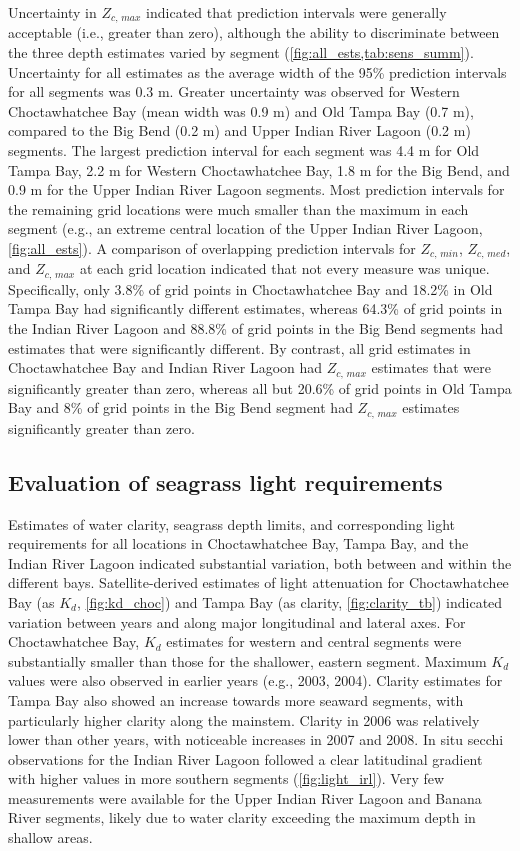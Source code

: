 \documentclass[letterpaper,12pt,oneside]{article}\usepackage[]{graphicx}\usepackage[]{color}
\begin{document}
Uncertainty in $Z_{c,\,max}$ indicated that prediction intervals were generally acceptable (i.e., greater than zero), although the ability to discriminate between the three depth estimates varied by segment (\cref{fig:all_ests,tab:sens_summ}). Uncertainty for all estimates as the average width of the 95\% prediction intervals for all segments was 0.3 m.  Greater uncertainty was observed for Western Choctawhatchee Bay (mean width was 0.9 m) and Old Tampa Bay (0.7 m), compared to the Big Bend (0.2 m) and Upper Indian River Lagoon (0.2 m) segments.  The largest prediction interval for each segment was 4.4 m for Old Tampa Bay, 2.2 m for Western Choctawhatchee Bay, 1.8 m for the Big Bend, and 0.9 m for the Upper Indian River Lagoon segments.  Most prediction intervals for the remaining grid locations were much smaller than the maximum in each segment (e.g., an extreme central location of the Upper Indian River Lagoon, \cref{fig:all_ests}).  A comparison of overlapping prediction intervals for $Z_{c,\,min}$, $Z_{c,\,med}$, and $Z_{c,\,max}$ at each grid location indicated that not every measure was unique.  Specifically, only 3.8\% of grid points in Choctawhatchee Bay and 18.2\% in Old Tampa Bay had significantly different estimates, whereas 64.3\% of grid points in the Indian River Lagoon and 88.8\% of grid points in the Big Bend segments had estimates that were significantly different.  By contrast, all grid estimates in Choctawhatchee Bay and Indian River Lagoon had $Z_{c,\,max}$ estimates that were significantly greater than zero, whereas all but 20.6\% of grid points in Old Tampa Bay and 8\% of grid points in the Big Bend segment had $Z_{c,\,max}$ estimates significantly greater than zero. 

\subsection{Evaluation of seagrass light requirements}

Estimates of water clarity, seagrass depth limits, and corresponding light requirements for all locations in Choctawhatchee Bay, Tampa Bay, and the Indian River Lagoon indicated substantial variation, both between and within the different bays.  Satellite-derived estimates of light attenuation for Choctawhatchee Bay (as $K_d$, \cref{fig:kd_choc}) and Tampa Bay (as clarity, \cref{fig:clarity_tb}) indicated variation between years and along major longitudinal and lateral axes.  For Choctawhatchee Bay, $K_d$ estimates for western and central segments were substantially smaller than those for the shallower, eastern segment.  Maximum $K_d$ values were also observed in earlier years (e.g., 2003, 2004).  Clarity estimates for Tampa Bay also showed an increase towards more seaward segments, with particularly higher clarity along the mainstem.  Clarity in 2006 was relatively lower than other years, with noticeable increases in 2007 and 2008.  In situ secchi observations for the Indian River Lagoon followed a clear latitudinal gradient with higher values in more southern segments (\cref{fig:light_irl}).  Very few measurements were available for the Upper Indian River Lagoon and Banana River segments, likely due to water clarity exceeding the maximum depth in shallow areas.
\end{document}
